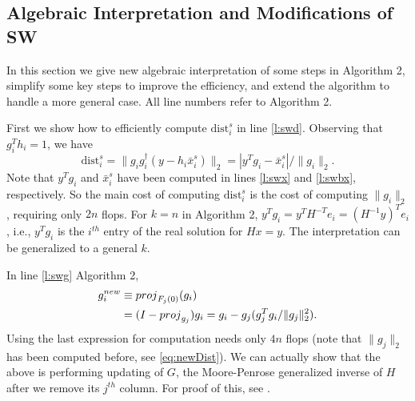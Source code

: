 \documentclass[conference]{IEEEtran}
\newcommand{\dist}{\mathrm{dist}}
\begin{document}
\subsection{Algebraic Interpretation and Modifications of SW}
\label{sec:improvedSW}
In this section we give new algebraic interpretation of some steps in Algorithm 2,
simplify some key steps to improve the efficiency,
and  extend the algorithm to handle a more general case.
All line numbers refer to Algorithm 2.

First we show  how to efficiently compute $\dist_i^s$ in line \ref{l:swd}. 
Observing that $g_i^Th_i = 1$, we have
\begin{equation}
\label{eq:newDist}
\dist_i^s =   \|  g_ig_i^\dag (y-h_i\bar{x}_i^s)  \|_2 
=    | y^Tg_i -\bar{x}_i^s |/\| g_i  \|_2.
\end{equation} 
Note that $y^Tg_i$ and $\bar{x}_i^s$ have been computed in lines \ref{l:swx} and \ref{l:swbx}, respectively.
So the main cost of computing $\dist_i^s$ is the cost of computing $\|g_i\|_2$,
requiring only $2n$ flops. 
For $k=n$ in Algorithm 2,  $y^Tg_i=y^TH^{-T}e_i=(H^{-1}y)^Te_i$, i.e.,  $y^Tg_i$
is the $i^{th}$ entry of the real solution for $Hx=y$. 
The interpretation can be generalized to  a general $k$. 

In line \ref{l:swg} Algorithm 2,  
\begin{align}
g_i^{\small \mbox{new}} & \equiv \mbox{proj}_{F_j(0)}(g_i)   \nonumber \\
  & =(I- \mbox{proj}_{g_j})g_i=g_i- g_j(g_j^Tg_i/\|g_j\|_2^2). \label{eq:gup}
\end{align}
Using the last expression for computation needs only $4n$ flops
(note that $\|g_j\|_2$ has been computed before, see \eqref{eq:newDist}).
We can actually show that the above is performing  updating of $G$, the Moore-Penrose generalized inverse of
$H$ after we remove its $j^{th}$ column. 
For proof of this, see \cite{Cli64}. 
\end{document}

